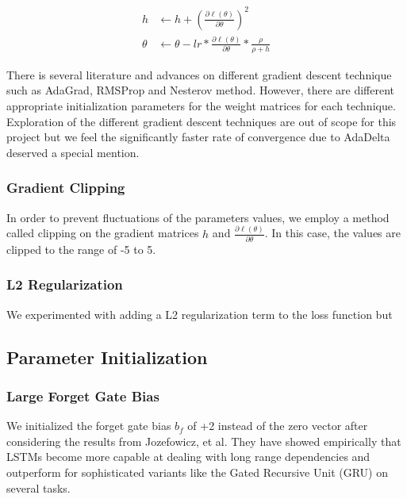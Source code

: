 \documentclass[fyp]{socreport}
\begin{document}
\begin{align*}
  h &\leftarrow h + \left( \frac{\partial \ell(\theta)}{\partial \theta} \right)^2 \\
  \theta &\leftarrow \theta - lr * \frac{\partial \ell(\theta)}{\partial \theta}
  * \frac{\rho}{\rho + h}
\end{align*}

There is several literature and advances on different gradient descent
technique such as AdaGrad, RMSProp and Nesterov method.  However, there are
different appropriate initialization parameters for the weight matrices for
each technique.  Exploration of the different gradient descent techniques
are out of scope for this project but we feel the significantly faster rate of
convergence due to AdaDelta deserved a special mention.

\subsubsection{Gradient Clipping} In order to prevent fluctuations of the parameters
values, we employ a method called clipping on the gradient matrices $h$ and
$\frac{\partial \ell(\theta)}{\partial \theta}$. In this case, the values are
clipped to the range of -5 to 5.

\subsubsection{L2 Regularization} We experimented with adding a L2
regularization term to the loss function but


\subsection{Parameter Initialization}

\subsubsection{Large Forget Gate Bias} We initialized the forget gate bias
$b_f$ of +2 instead of the zero vector after considering the results from
Jozefowicz, et al\cite{ICML2015JozefowiczZS}. They have showed empirically that
LSTMs become more capable at dealing with long range dependencies and outperform
for sophisticated variants like the Gated Recursive Unit (GRU) on several
tasks.
\end{document}
